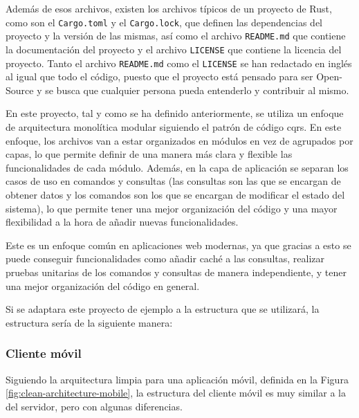 Además de esos archivos, existen los archivos típicos de un proyecto de Rust, como son el \texttt{Cargo.toml} y el \texttt{Cargo.lock}, que definen las dependencias del proyecto y la versión de las mismas, así como el archivo \texttt{README.md} que contiene la documentación del proyecto y el archivo \texttt{LICENSE} que contiene la licencia del proyecto. Tanto el archivo \texttt{README.md} como el \texttt{LICENSE} se han redactado en inglés al igual que todo el código, puesto que el proyecto está pensado para ser Open-Source y se busca que cualquier persona pueda entenderlo y contribuir al mismo.

En este proyecto, tal y como se ha definido anteriormente, se utiliza un enfoque de arquitectura monolítica modular siguiendo el patrón de código \acrshort{cqrs}.
En este enfoque, los archivos van a estar organizados en módulos en vez de agrupados por capas, lo que permite definir de una manera más clara y flexible las funcionalidades de cada módulo.
Además, en la capa de aplicación se separan los casos de uso en comandos y consultas (las consultas son las que se encargan de obtener datos y los comandos son los que se encargan de modificar el estado del sistema), lo que permite tener una mejor organización del código y una mayor flexibilidad a la hora de añadir nuevas funcionalidades.

Este es un enfoque común en aplicaciones web modernas, ya que gracias a esto se puede conseguir funcionalidades como añadir caché a las consultas, realizar pruebas unitarias de los comandos y consultas de manera independiente, y tener una mejor organización del código en general.

Si se adaptara este proyecto de ejemplo a la estructura que se utilizará, la estructura sería de la siguiente manera:

\newpage
{}

\subsubsection{Cliente móvil}
Siguiendo la arquitectura limpia para una aplicación móvil, definida en la Figura \ref{fig:clean-architecture-mobile}, la estructura del cliente móvil es muy similar a la del servidor, pero con algunas diferencias.

